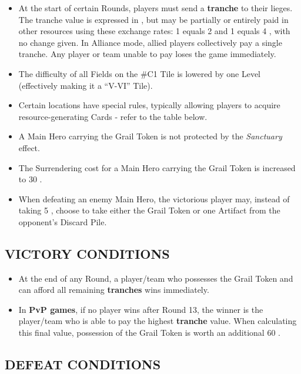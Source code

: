 \begin{multicols}{2}
\begin{itemize}
  \item At the start of certain Rounds, players must send a \textbf{tranche} to their lieges. The tranche value is expressed in , but may be partially or entirely paid in other resources using these exchange rates: 1  equals 2  and 1  equals 4 , with no change given. In Alliance mode, allied players collectively pay a single tranche. Any player or team unable to pay loses the game immediately.  
  \item The difficulty of all Fields on the \#C1 Tile is lowered by one Level (effectively making it a ``V-VI'' Tile).  
  \item Certain locations have special rules, typically allowing players to acquire resource-generating Cards - refer to the table below.
  \item A Main Hero carrying the Grail Token is not protected by the \textit{Sanctuary} effect.
  \item The Surrendering cost for a Main Hero carrying the Grail Token is increased to 30 .
  \item When defeating an enemy Main Hero, the victorious player may, instead of taking 5 , choose to take either the Grail Token or one Artifact from the opponent's Discard Pile.
\end{itemize}

\subsection*{\MakeUppercase{Victory Conditions}}  

\begin{itemize}  
  \item At the end of any Round, a player/team who possesses the Grail Token and can afford all remaining \textbf{tranches} wins immediately.  
  \item In \textbf{PvP games}, if no player wins after Round 13, the winner is the player/team who is able to pay the highest \textbf{tranche} value. When calculating this final value, possession of the Grail Token is worth an additional 60 .  
\end{itemize}  

\subsection*{\MakeUppercase{Defeat Conditions}}  


\end{multicols}
